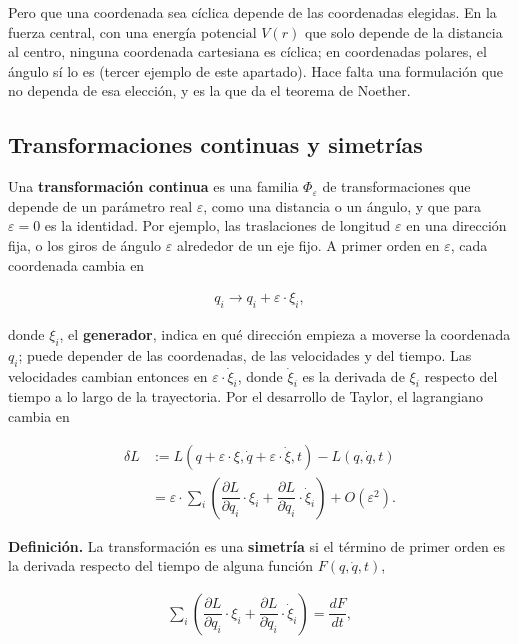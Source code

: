 \documentclass[11pt,a4paper,spanish]{book}
\begin{document}
Pero que una coordenada sea cíclica depende de las coordenadas elegidas.
En la fuerza central, con una energía potencial \(V(r)\) que solo
depende de la distancia al centro, ninguna coordenada cartesiana es
cíclica; en coordenadas polares, el ángulo sí lo es (tercer ejemplo de
este apartado). Hace falta una formulación que no dependa de esa
elección, y es la que da el teorema de Noether.

\subsection{Transformaciones continuas y
simetrías}\label{transformaciones-continuas-y-simetruxedas}

Una \textbf{transformación continua} es una familia \(\Phi_\varepsilon\)
de transformaciones que depende de un parámetro real \(\varepsilon\),
como una distancia o un ángulo, y que para \(\varepsilon = 0\) es la
identidad. Por ejemplo, las traslaciones de longitud \(\varepsilon\) en
una dirección fija, o los giros de ángulo \(\varepsilon\) alrededor de
un eje fijo. A primer orden en \(\varepsilon\), cada coordenada cambia
en

\[
\begin{aligned}
q_i \to q_i + \varepsilon \cdot \xi_i,
\end{aligned}
\]

donde \(\xi_i\), el \textbf{generador}, indica en qué dirección empieza
a moverse la coordenada \(q_i\); puede depender de las coordenadas, de
las velocidades y del tiempo. Las velocidades cambian entonces en
\(\varepsilon \cdot \dot{\xi}_i\), donde \(\dot{\xi}_i\) es la derivada
de \(\xi_i\) respecto del tiempo a lo largo de la trayectoria. Por el
desarrollo de Taylor, el lagrangiano cambia en

\[
\begin{aligned}
\delta L &:= L(q + \varepsilon \cdot \xi, \dot{q} + \varepsilon \cdot \dot{\xi}, t) - L(q, \dot{q}, t) \\
&= \varepsilon \cdot \sum_i \left( \dfrac{\partial L}{\partial q_i} \cdot \xi_i + \dfrac{\partial L}{\partial \dot{q}_i} \cdot \dot{\xi}_i \right) + O(\varepsilon^2).
\end{aligned}
\]

\textbf{Definición.} La transformación es una \textbf{simetría} si el
término de primer orden es la derivada respecto del tiempo de alguna
función \(F(q, \dot{q}, t)\),

\[
\begin{aligned}
\sum_i \left( \dfrac{\partial L}{\partial q_i} \cdot \xi_i + \dfrac{\partial L}{\partial \dot{q}_i} \cdot \dot{\xi}_i \right) = \dfrac{dF}{dt},
\end{aligned}
\]
\end{document}
